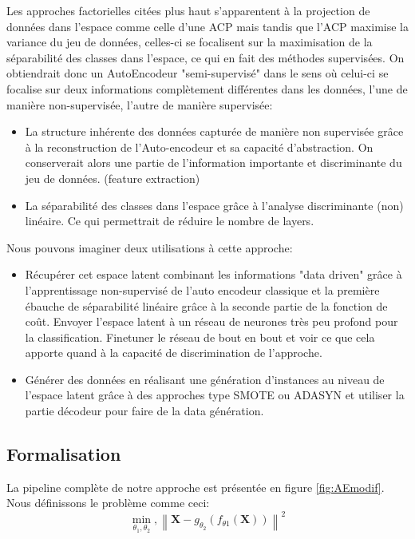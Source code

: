Les approches factorielles citées plus haut s'apparentent à la projection de données dans l'espace comme celle d'une ACP mais tandis que l'ACP maximise la variance du jeu de données, celles-ci se focalisent sur la maximisation de la séparabilité des classes dans l'espace, ce qui en fait des méthodes supervisées. On obtiendrait donc un AutoEncodeur "semi-supervisé" dans le sens où celui-ci se focalise sur deux informations complètement différentes dans les données, l'une de manière non-supervisée, l'autre de manière supervisée:
\begin{itemize}
    \item La structure inhérente des données capturée de manière non supervisée grâce à la reconstruction de l'Auto-encodeur et sa capacité d'abstraction. On conserverait alors une partie de l'information importante et discriminante du jeu de données. (feature extraction)
    \item La séparabilité des classes dans l'espace grâce à l'analyse discriminante (non) linéaire. Ce qui permettrait de réduire le nombre de layers.
\end{itemize}{}


Nous pouvons imaginer deux utilisations à cette approche:
\begin{itemize}
    \item Récupérer cet espace latent combinant les informations "data driven" grâce à l'apprentissage non-supervisé de l'auto encodeur classique et la première ébauche de séparabilité linéaire grâce à la seconde partie de la fonction de coût. Envoyer l'espace latent à un réseau de neurones très peu profond pour la classification. Finetuner le réseau de bout en bout et voir ce que cela apporte quand à la capacité de discrimination de l'approche. 
    \item Générer des données en réalisant une génération d'instances au niveau de l'espace latent grâce à des approches type SMOTE \cite{chawla2002smote} ou ADASYN \cite{he2008adasyn}  et utiliser la partie décodeur pour  faire de la data génération.
\end{itemize}

\subsection{Formalisation}
La pipeline complète de notre approche est présentée en figure \ref{fig:AEmodif}.
Nous définissons le problème comme ceci: \newline
$$\min _{\theta_{1}, \theta_{2}},\left\|\mathbf{X}-g_{\theta_{2}}\left(f_{\theta 1}(\mathbf{X})\right)\right\|^{2}$$

